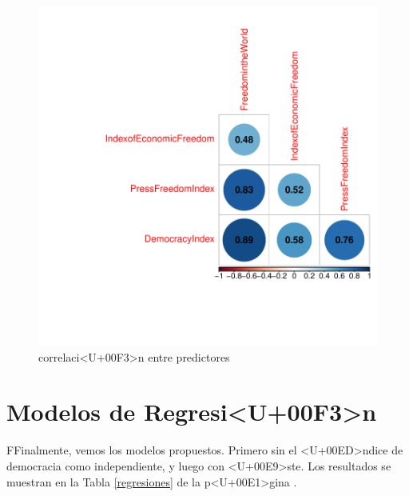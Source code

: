 \documentclass{article}
\begin{document}
\begin{figure}[h]
\centering
\begin{adjustbox}{width=7cm,height=7cm,clip,trim=1.5cm 0.5cm 0cm 1.5cm}
\includegraphics{paperVersion_6-corrPlotX}
\end{adjustbox}
\caption{correlaci<U+00F3>n entre predictores}
\label{corrPlotX}
\end{figure}


\clearpage

\section{Modelos de Regresi<U+00F3>n}

FFinalmente, vemos los modelos propuestos. Primero sin el <U+00ED>ndice de democracia como independiente, y luego con <U+00E9>ste. Los resultados se muestran en la Tabla \ref{regresiones} de la p<U+00E1>gina \pageref{regresiones}.
\end{document}
